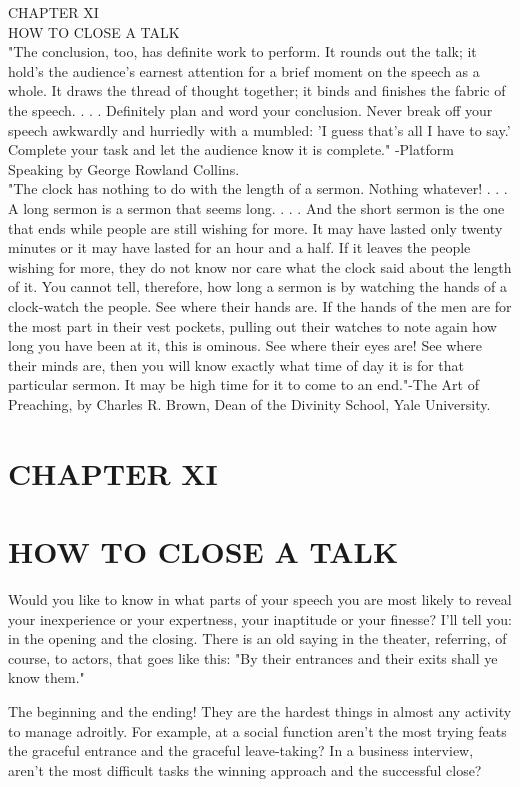 \documentclass[10pt]{article}
\begin{document}
CHAPTER XI\\
HOW TO CLOSE A TALK\\
"The conclusion, too, has definite work to perform. It rounds out the talk; it hold's the audience's earnest attention for a brief moment on the speech as a whole. It draws the thread of thought together; it binds and finishes the fabric of the speech. . . . Definitely plan and word your conclusion. Never break off your speech awkwardly and hurriedly with a mumbled: 'I guess that's all I have to say.' Complete your task and let the audience know it is complete." -Platform Speaking by George Rowland Collins.\\
"The clock has nothing to do with the length of a sermon. Nothing whatever! . . . A long sermon is a sermon that seems long. . . . And the short sermon is the one that ends while people are still wishing for more. It may have lasted only twenty minutes or it may have lasted for an hour and a half. If it leaves the people wishing for more, they do not know nor care what the clock said about the length of it. You cannot tell, therefore, how long a sermon is by watching the hands of a clock-watch the people. See where their hands are. If the hands of the men are for the most part in their vest pockets, pulling out their watches to note again how long you have been at it, this is ominous. See where their eyes are! See where their minds are, then you will know exactly what time of day it is for that particular sermon. It may be high time for it to come to an end."-The Art of Preaching, by Charles R. Brown, Dean of the Divinity School, Yale University.

\section*{CHAPTER XI}
\section*{HOW TO CLOSE A TALK}
Would you like to know in what parts of your speech you are most likely to reveal your inexperience or your expertness, your inaptitude or your finesse? I'll tell you: in the opening and the closing. There is an old saying in the theater, referring, of course, to actors, that goes like this: "By their entrances and their exits shall ye know them."

The beginning and the ending! They are the hardest things in almost any activity to manage adroitly. For example, at a social function aren't the most trying feats the graceful entrance and the graceful leave-taking? In a business interview, aren't the most difficult tasks the winning approach and the successful close?
\end{document}
